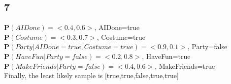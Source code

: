 \documentclass{article}
\begin{document}
        \subsection{7}
            \textbf{P}$(AIDone)=<0.4,0.6>$, AIDone=true
            \\\textbf{P}$(Costume)=<0.3,0.7>$, Costume=true
            \\\textbf{P}$(Party|AIDone=true, Costume=true)=<0.9,0.1>$, Party=false
            \\\textbf{P}$(HaveFun|Party=false)=<0.2,0.8>$, HaveFun=true
            \\\textbf{P}$(MakeFriends|Party=false)=<0.4,0.6>$, MakeFriends=true
            \\Finally, the least likely sample is [true,true,false,true,true]
\end{document}
